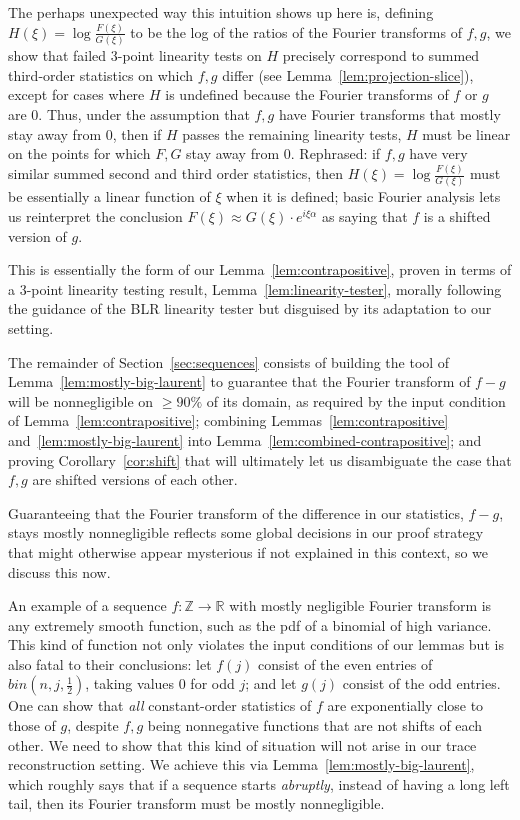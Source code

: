 \documentclass[11pt]{article}
\theoremstyle{plain}
\begin{document}
The perhaps unexpected way this intuition shows up here is, defining $H(\xi)=\log\frac{F(\xi)}{G(\xi)}$ to be the log of the ratios of the Fourier transforms of $f,g$, we show that failed 3-point linearity tests on $H$ precisely correspond to summed third-order statistics on which $f,g$ differ (see Lemma~\ref{lem:projection-slice}), except for cases where $H$ is undefined because the Fourier transforms of $f$ or $g$ are 0. Thus, under the assumption that $f,g$ have Fourier transforms that mostly stay away from 0, then if $H$ passes the remaining linearity tests, $H$ must be linear on the points for which $F,G$ stay away from 0. Rephrased: if $f,g$ have very similar summed second and third order statistics, then $H(\xi)=\log\frac{F(\xi)}{G(\xi)}$ must be essentially a linear function of $\xi$ when it is defined; basic Fourier analysis lets us reinterpret the conclusion $F(\xi)\approx G(\xi)\cdot e^{i\xi\alpha}$ as saying that $f$ is a shifted version of $g$.

This is essentially the form of our Lemma~\ref{lem:contrapositive}, proven in terms of a 3-point linearity testing result, Lemma~\ref{lem:linearity-tester}, morally following the guidance of the BLR linearity tester but disguised by its adaptation to our setting.

The remainder of Section~\ref{sec:sequences} consists of building the tool of Lemma~\ref{lem:mostly-big-laurent} to guarantee that the Fourier transform of $f-g$ will be nonnegligible on $\geq 90\%$ of its domain, as required by the input condition of Lemma~\ref{lem:contrapositive}; combining Lemmas~\ref{lem:contrapositive} and~\ref{lem:mostly-big-laurent} into Lemma~\ref{lem:combined-contrapositive}; and proving Corollary~\ref{cor:shift} that will ultimately let us disambiguate the case that $f,g$ are shifted versions of each other.

\medskip{}

Guaranteeing that the Fourier transform of the difference in our statistics, $f-g$, stays mostly nonnegligible reflects some global decisions in our proof  strategy that might otherwise appear mysterious if not explained in this context, so we discuss this now.

An example of a sequence $f:\mathbb{Z}\rightarrow \mathbb{R}$ with mostly negligible Fourier transform is any extremely smooth function, such as the pdf of a binomial of high variance. This kind of function not only violates the input conditions of our lemmas but is also fatal to their conclusions: let $f(j)$ consist of the even entries of $bin(n,j,\frac{1}{2})$, taking values 0 for odd $j$; and let $g(j)$ consist of the odd entries. One can show that \emph{all} constant-order statistics of $f$ are exponentially close to those of $g$, despite $f,g$ being nonnegative functions that are not shifts of each other. We need to show that this kind of situation will not arise in our trace reconstruction setting. We achieve this via Lemma~\ref{lem:mostly-big-laurent}, which roughly says that if a sequence starts \emph{abruptly}, instead of having a long left tail, then its Fourier transform must be mostly nonnegligible.
\end{document}
